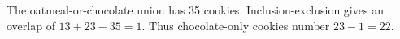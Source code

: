The oatmeal-or-chocolate union has 35 cookies. Inclusion-exclusion gives an overlap of $13+23-35=1$. Thus chocolate-only cookies number $23-1=\boxed{22}$.
